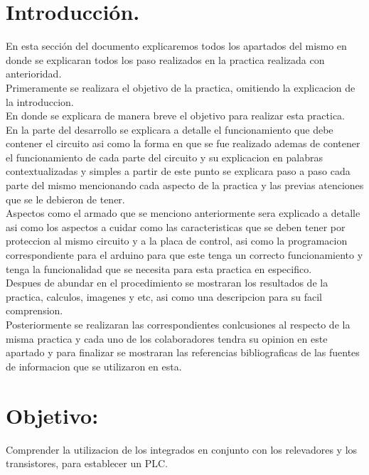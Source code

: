 \documentclass[12pt,a4paper]{article}
\begin{document}
\section{Introducción.}
En esta sección del documento explicaremos todos los apartados del mismo en donde se explicaran todos los paso realizados en la practica realizada con anterioridad.\\
 Primeramente se realizara el objetivo de la practica, omitiendo la explicacion de la introduccion.\\
 En donde se explicara de manera breve el objetivo para realizar esta practica.\\
 En la parte del desarrollo se explicara a detalle el funcionamiento que debe contener el circuito asi como la forma en que se fue realizado ademas de contener el funcionamiento de cada parte del circuito y su explicacion en palabras contextualizadas y simples a partir de este punto se explicara paso a paso cada parte del mismo mencionando cada aspecto de la practica y las previas atenciones que se le debieron de tener.\\
 Aspectos como el armado que se menciono anteriormente sera explicado a detalle asi como los aspectos a cuidar como las caracteristicas que se deben tener por proteccion al mismo circuito y a la placa de control, asi como la programacion correspondiente para el arduino para que  este tenga un correcto funcionamiento y tenga la funcionalidad que se necesita para esta practica en especifico.\\
 Despues de abundar en el procedimiento se mostraran los resultados de la practica, calculos, imagenes y etc, asi como una descripcion para su facil comprension.\\
 Posteriormente se realizaran las correspondientes conlcusiones al respecto de la misma practica y cada uno de los colaboradores  tendra su opinion en este apartado y para finalizar se mostraran las referencias bibliograficas de las fuentes de informacion que se utilizaron en esta.  

 \section{Objetivo:}
Comprender la utilizacion de los integrados en conjunto con los relevadores y los transistores, para establecer un PLC.
\end{document}
